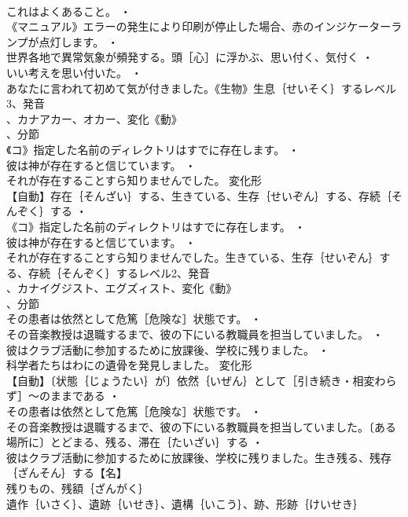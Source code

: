 \documentclass[8pt]{extreport}
\begin{document}
\begin{CJK}{UTF8}{min}
\\	これはよくあること。 ・
\\	《マニュアル》エラーの発生により印刷が停止した場合、赤のインジケーターランプが点灯します。 ・
\\	世界各地で異常気象が頻発する。頭［心］に浮かぶ、思い付く、気付く ・
\\	いい考えを思い付いた。 ・
\\	あなたに言われて初めて気が付きました。《生物》生息｛せいそく｝するレベル3、発音
\\	、カナアカー、オカー、変化《動》
\\	、分節
\\	《コ》指定した名前のディレクトリはすでに存在します。 ・
\\	彼は神が存在すると信じています。 ・
\\	それが存在することすら知りませんでした。	変化形 
\\	【自動】存在｛そんざい｝する、生きている、生存｛せいぞん｝する、存続｛そんぞく｝する ・
\\	《コ》指定した名前のディレクトリはすでに存在します。 ・
\\	彼は神が存在すると信じています。 ・
\\	それが存在することすら知りませんでした。生きている、生存｛せいぞん｝する、存続｛そんぞく｝するレベル2、発音
\\	、カナイグジスト、エグズィスト、変化《動》
\\	、分節
\\	その患者は依然として危篤［危険な］状態です。 ・
\\	その音楽教授は退職するまで、彼の下にいる教職員を担当していました。 ・
\\	彼はクラブ活動に参加するために放課後、学校に残りました。 ・
\\	科学者たちはわにの遺骨を発見しました。	変化形 
\\	【自動】〔状態｛じょうたい｝が〕依然｛いぜん｝として［引き続き・相変わらず］～のままである ・
\\	その患者は依然として危篤［危険な］状態です。 ・
\\	その音楽教授は退職するまで、彼の下にいる教職員を担当していました。〔ある場所に〕とどまる、残る、滞在｛たいざい｝する ・
\\	彼はクラブ活動に参加するために放課後、学校に残りました。生き残る、残存｛ざんそん｝する【名】
\\	残りもの、残額｛ざんがく｝
\\	遺作｛いさく｝、遺跡｛いせき｝、遺構｛いこう｝、跡、形跡｛けいせき｝

\end{CJK}
\end{document}
